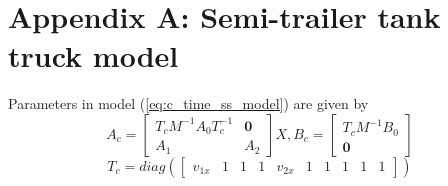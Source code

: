 

\section*{Appendix A: Semi-trailer tank truck model}
\label{appendix:A}
Parameters in model (\ref{eq:c_time_ss_model}) are given by
\begin{equation}
A_{c} = 
\begin{bmatrix}
{T_{c}M^{- 1}A_{0}T_{c}^{-1}} & \textbf{0} \\
A_{1} & A_{2}
\end{bmatrix}
X,B_{c} = 
\begin{bmatrix}
{T_{c}M^{- 1}B_{0}} \\ \textbf{0}
\end{bmatrix}\nonumber
\end{equation}
\vspace{-0.3cm}
\begin{equation}
T_{c} = diag\left( \begin{bmatrix}
v_{1x} & 1 & 1 & 1 & v_{2x} & 1 & 1 & 1 & 1 & 1
\end{bmatrix} \right)\nonumber
\end{equation}

\vspace{-0.7cm}

